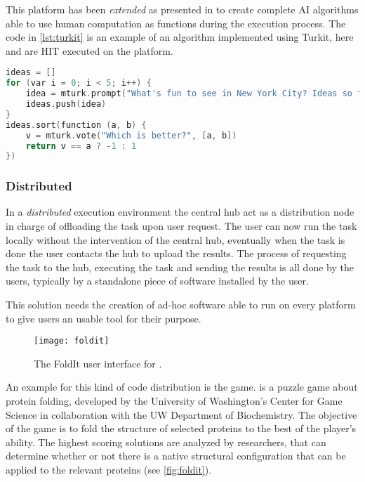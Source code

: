 This platform has been \emph{extended} as presented in \cite{little2010turkit}
to create complete \acl{AI} algorithms able to use human computation as functions
during the execution process. The code in \autoref{lst:turkit} is an example of an
algorithm implemented using Turkit, here  and 
are \acl{HIT} executed on the  platform.
\begin{lstlisting}[language=C++,caption={Example of a Turkit algorithm.},
label={lst:turkit}]
ideas = []
for (var i = 0; i < 5; i++) {
	idea = mturk.prompt("What's fun to see in New York City? Ideas so far: " + ideas.join(", "))
	ideas.push(idea)
}
ideas.sort(function (a, b) {
	v = mturk.vote("Which is better?", [a, b])
	return v == a ? -1 : 1
})
\end{lstlisting}







\subsubsection{Distributed}
In a \emph{distributed} execution environment the central hub act as a distribution
node in charge of offloading the task upon user request. The user can now run the
task locally without the intervention of the central hub, eventually when the task
is done the user contacts the hub to upload the results.
The process of requesting the task to the hub, executing the task and sending the
results is all done by the users, typically by a standalone piece of software
installed by the user.

This solution needs the creation of ad-hoc software able to run on every platform
to give users an usable tool for their purpose.\\


\begin{figure}[htb]
    \centering
    \texttt{[image: foldit]}
    \caption{The FoldIt user interface for .}
    \label{fig:foldit}
\end{figure}
An example for this kind of code distribution is the  game.
 is a puzzle game about protein folding, developed
by the University of Washington's Center for Game Science in collaboration with
the UW Department of Biochemistry. The objective of the game is to fold the
structure of selected proteins to the best of the player's ability. The highest
scoring solutions are analyzed by researchers, that can determine whether or not
there is a native structural configuration that can be applied to the relevant
proteins (see \autoref{fig:foldit}).







